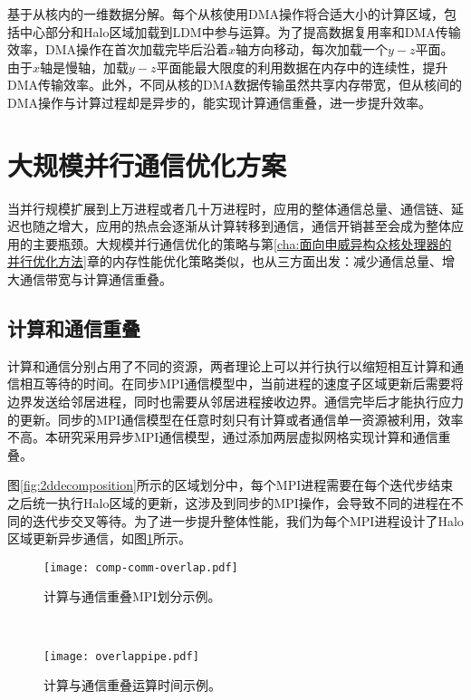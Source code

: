 基于从核内的一维数据分解。每个从核使用DMA操作将合适大小的计算区域，包括中心部分和Halo区域加载到LDM中参与运算。为了提高数据复用率和DMA传输效率，DMA操作在首次加载完毕后沿着$x$轴方向移动，每次加载一个$y-z$平面。由于$x$轴是慢轴，加载$y-z$平面能最大限度的利用数据在内存中的连续性，提升DMA传输效率。此外，不同从核的DMA数据传输虽然共享内存带宽，但从核间的DMA操作与计算过程却是异步的，能实现计算通信重叠，进一步提升效率。


\section{大规模并行通信优化方案}

当并行规模扩展到上万进程或者几十万进程时，应用的整体通信总量、通信链、延迟也随之增大，应用的热点会逐渐从计算转移到通信，通信开销甚至会成为整体应用的主要瓶颈。大规模并行通信优化的策略与第\ref{cha:面向申威异构众核处理器的并行优化方法}章的内存性能优化策略类似，也从三方面出发：减少通信总量、增大通信带宽与计算通信重叠。

\subsection{计算和通信重叠}

计算和通信分别占用了不同的资源，两者理论上可以并行执行以缩短相互计算和通信相互等待的时间。在同步MPI通信模型中，当前进程的速度子区域更新后需要将边界发送给邻居进程，同时也需要从邻居进程接收边界。通信完毕后才能执行应力的更新。同步的MPI通信模型在任意时刻只有计算或者通信单一资源被利用，效率不高。本研究采用异步MPI通信模型，通过添加两层虚拟网格实现计算和通信重叠。

图\ref{fig:2ddecomposition}所示的区域划分中，每个MPI进程需要在每个迭代步结束之后统一执行Halo区域的更新，这涉及到同步的MPI操作，会导致不同的进程在不同的迭代步交叉等待。为了进一步提升整体性能，我们为每个MPI进程设计了Halo区域更新异步通信，如图\ref{fig:comp-comm-overlap}所示。

\begin{figure*}[ht]
    \centering
    \begin{subfigure}[b]{0.5\textwidth}
        \centering
        \texttt{[image: comp-comm-overlap.pdf]}
        \caption{计算与通信重叠MPI划分示例。}
        \label{fig:comp-comm-overlap}
    \end{subfigure}%
    ~
    \begin{subfigure}[b]{0.5\textwidth}
        \centering
        \texttt{[image: overlappipe.pdf]}
        \caption{计算与通信重叠运算时间示例。}
        \label{fig:overlappipe}
    \end{subfigure}
\end{figure*}

